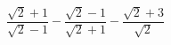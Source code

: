 \begin{ex}[type=expression]
	\begin{condition}
		\( \dfrac{\sqrt{2}+1}{\sqrt{2}-1}-\dfrac{\sqrt{2}-1}{\sqrt{2}+1}-\dfrac{\sqrt{2}+3}{\sqrt{2}} \)
	\end{condition}
\end{ex}